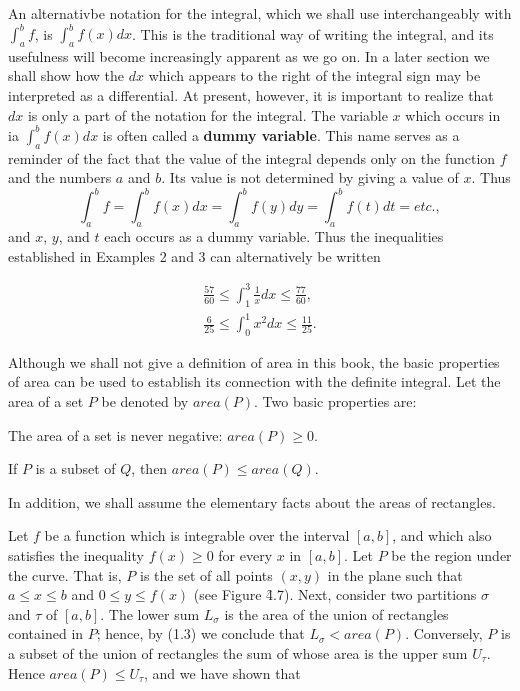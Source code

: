 An alternativbe notation for the integral, which we shall use interchangeably with $\int_{a}^{b} f$, is $\int_{a}^{b} f(x) dx$. This is the traditional way of writing the integral, and its usefulness will become increasingly apparent as we go on. In a later section we shall show how the $dx$ which appears to the right of the integral sign may be interpreted as a differential. At present, however,  it is important to realize that $dx$ is only a part of the notation for the integral. The variable $x$ which occurs in ia $\int_{a}^{b} f(x) dx$ is often called a \textbf{dummy variable}. This name serves as a reminder of the fact that the value of the integral depends only on the function $f$ and the numbers $a$ and $b$. Its value is not determined by giving a value of $x$. Thus
$$
\int_{a}^{b} f = \int_{a}^{b} f (x) dx = \int_{a}^{b} f (y) dy = \int_{a}^{b} f (t) dt = etc.,
$$
\noindent and $x$, $y$, and $t$ each occurs as a dummy variable. Thus the inequalities established in Examples 2 and 3 can alternatively be written

\begin{eqnarray*}
\frac{57}{60} \leq \int_{1}^{3} \frac{1}{x} dx \leq \frac{77}{60},\\
\frac{6}{25} \leq \int_{0}^{1} x^2 dx \leq \frac{11}{25}.
\end{eqnarray*}

 
Although we shall not give a definition of area in this book, the basic properties of area can be used to establish its connection with the definite integral. Let the area of a set $P$ be denoted by $area (P)$. 
Two basic properties are:

\begin{theorem} %
The area of a set is never negative: $area(P) \geq 0$.
\end{theorem}

\begin{theorem} %
If $P$ is a subset of $Q$, then $area(P) \leq area(Q)$.
\end{theorem}

In addition, we shall assume the elementary facts about the areas of rectangles.


Let $f$ be a function which is integrable over the interval $[a, b]$, and which also satisfies the inequality $f(x) \geq 0$ for every $x$ in $[a, b]$. Let $P$ be the region under the curve. That is, $P$ is the set of all points $(x, y)$ in the plane such that $a \leq x \leq b$ and $0 \leq y \leq f(x)$ (see Figure \f{4.7}). Next, consider two partitions $\sigma$ and $\tau$ of $[a,b]$. The lower sum $L_{\sigma}$ is the area of the union of rectangles contained in $P$; hence, by (1.3) we conclude that $L_{\sigma} < area (P)$. Conversely, $P$ is a subset of the union of rectangles the sum of whose area is the upper sum $U_{\tau}$. Hence $area (P) \leq U_{\tau}$, and we have shown that

